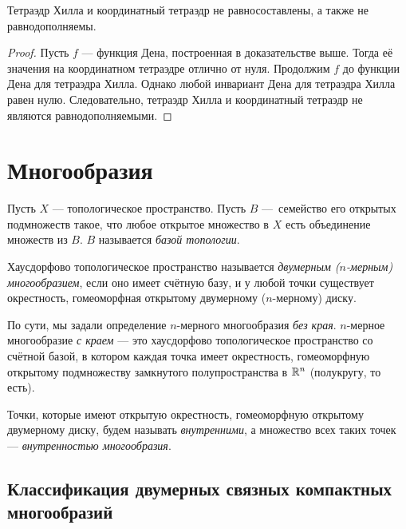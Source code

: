 \begin{statement}
    Тетраэдр Хилла и координатный тетраэдр не равносоставлены, а также не равнодополняемы.
\end{statement}
\begin{proof}
    Пусть $f$ — функция Дена, построенная в доказательстве выше. Тогда её значения на координатном тетраэдре отлично от нуля. Продолжим $f$ до функции Дена для тетраэдра Хилла. Однако любой инвариант Дена для тетраэдра Хилла равен нулю. Следовательно, тетраэдр Хилла и координатный тетраэдр не являются равнодополняемыми.
\end{proof} 

\newpage
\section{Многообразия}

\begin{definition}
    Пусть $X$ — топологическое пространство. Пусть $B$ — семейство его открытых подмножеств такое, что любое открытое множество в $X$ есть объединение множеств из $B$. $B$ называется \textit{базой топологии}.
\end{definition}

\begin{definition}
    Хаусдорфово топологическое пространство называется \textit{двумерным ($n$-мерным) многообразием}, если оно имеет счётную базу, и у любой точки существует окрестность, гомеоморфная открытому двумерному ($n$-мерному) диску.
\end{definition}

\begin{remark}
    По сути, мы задали определение $n$-мерного многообразия \textit{без края}. $n$-мерное многообразие \textit{с краем} — это хаусдорфово топологическое пространство со счётной базой, в котором каждая точка имеет окрестность, гомеоморфную открытому подмножеству замкнутого полупространства в $\mathbb{R}^n$ (полукругу, то есть).
\end{remark}

\begin{remark}
    Точки, которые имеют открытую окрестность, гомеоморфную открытому двумерному диску, будем называть \textit{внутренними}, а множество всех таких точек — \textit{внутренностью многообразия}.
\end{remark}

\subsection{Классификация двумерных связных компактных многообразий}

